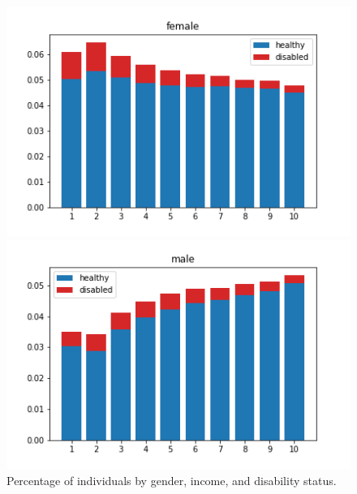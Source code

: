 \documentclass[\main/main.tex]{subfiles}
\begin{document}
\begin{figure}[H]
    \centering
    \begin{minipage}{.5\textwidth}
        \centering
        \includegraphics[scale=.5]{images/disability_female.png}
    \end{minipage}%
   \begin{minipage}{.5\textwidth}
        \centering
        \includegraphics[scale=.5]{images/disability_male.png}
    \end{minipage}
    \caption{Percentage of individuals by gender, income, and disability status.}
    \label{fig:disability_True}
\end{figure}
\end{document}
